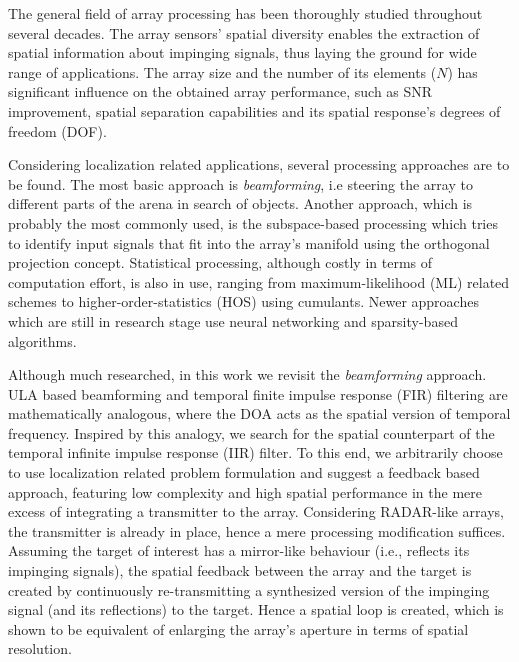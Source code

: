 The general field of array processing has been thoroughly studied throughout several decades.
The array sensors' spatial diversity enables the extraction of spatial information about impinging signals, thus laying the ground for wide range of applications.
The array size and the number of its elements ($N$) has significant influence on the obtained array performance, such as SNR improvement, spatial separation capabilities and its spatial response's degrees of freedom (DOF).
\par 
Considering localization related applications, several processing approaches are to be found. The most basic approach is \emph{beamforming}, i.e steering the array to different parts of the arena in search of objects.
Another approach, which is probably the most commonly used, is the subspace-based processing which tries to identify input signals that fit into the array's manifold using the orthogonal projection concept.
Statistical processing, although costly in terms of computation effort, is also in use, ranging from maximum-likelihood (ML) related schemes to higher-order-statistics (HOS) using cumulants.
Newer approaches which are still in research stage use neural networking and sparsity-based algorithms.
\par
Although much researched, in this work we revisit the \emph{beamforming} approach.
ULA based beamforming and temporal finite impulse response (FIR) filtering are mathematically analogous, where the DOA acts as the spatial version of temporal frequency.
Inspired by this analogy, we search for the spatial counterpart of the temporal infinite impulse response (IIR) filter.
To this end, we arbitrarily choose to use localization related problem formulation and suggest a feedback based approach, featuring low complexity and high spatial performance in the mere excess of integrating a transmitter to the array.
Considering RADAR-like arrays, the transmitter is already in place, hence a mere processing modification suffices.
Assuming the target of interest has a mirror-like behaviour (i.e., reflects its impinging signals), the spatial feedback between the array and the target is created by continuously re-transmitting a synthesized version of the impinging signal (and its reflections) to the target.
Hence a spatial loop is created, which is shown to be equivalent of enlarging the array's aperture in terms of spatial resolution.
